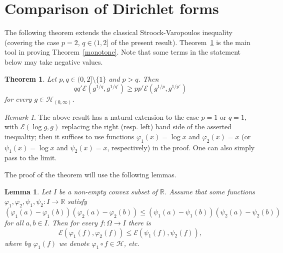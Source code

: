 \documentclass[11pt]{amsart}
\newcommand{\R}{\mathbb{R}}
\newcommand{\1}{\mathbf{1}}
\def\R{{\mathbb R}}
\def\e{{\mathcal{E}}}
\def\H{{\mathcal{H}}}
\theoremstyle{definition}
\theoremstyle{plain}
\newtheorem{lemma}[example]{Lemma}
\newtheorem{theorem}[example]{Theorem}
\theoremstyle{remark}
\newtheorem{remark}[example]{Remark}
\numberwithin{equation}{section}
\begin{document}
\section{Comparison of Dirichlet forms}

The following theorem extends the classical Stroock-Varopoulos inequality \cite{Stroock84, Varopoulos85}  (covering the case $p=2$,
$q \in (1,2]$ of the present result). Theorem~\ref{sv} is the main tool in proving Theorem~\ref{monotone}.
Note that some terms in the statement below may take negative values.

\begin{theorem} \label{sv}
Let $p,q \in (0,2]\setminus \{ 1\}$ and $p>q$. Then
\[
qq'\e(g^{1/q},g^{1/q'}) \geq pp'\e(g^{1/p},g^{1/p'})
\]
for every $g \in \H_{(0, \infty)}$.
\end{theorem}

\begin{remark} \label{case1}
The above result has a natural extension to the case $p=1$ or
$q=1$, with $\e(\log g, g)$ replacing the right (resp. left) hand side of the asserted inequality;
then it suffices to use functions $\varphi_{1}(x)=\log x$ and $\varphi_{2}(x)=x$ (or $\psi_{1}(x)=\log x$
and $\psi_{2}(x)=x$, respectively) in the proof. One can also simply pass to the limit.
\end{remark}

The proof of the theorem will use the following lemmas.

\begin{lemma} \label{comp}
Let $I$ be a non-empty convex subset of $\R$. Assume that
some functions $\varphi_{1}, \varphi_{2}, \psi_{1}, \psi_{2}:
I \rightarrow \R$ satisfy
\[
(\varphi_{1}(a)-\varphi_{1}(b))
(\varphi_{2}(a)-\varphi_{2}(b)) \leq
(\psi_{1}(a)-\psi_{1}(b))
(\psi_{2}(a)-\psi_{2}(b))
\]
for all $a, b \in I$. Then for every $f:\Omega \rightarrow I$
there is
\[
\e(\varphi_{1}(f),\varphi_{2}(f)) \leq
\e(\psi_{1}(f),\psi_{2}(f)),
\]
where by $\varphi_{1}(f)$ we denote
$\varphi_{1} \circ f \in \H$, etc.
\end{lemma}
\end{document}
